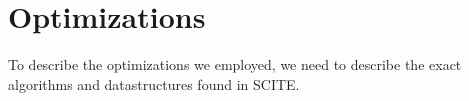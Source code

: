 \chapter{Optimizations}
\label{ch:findings}

To describe the optimizations we employed, we need to describe the exact algorithms and datastructures found in \ac{SCITE}.